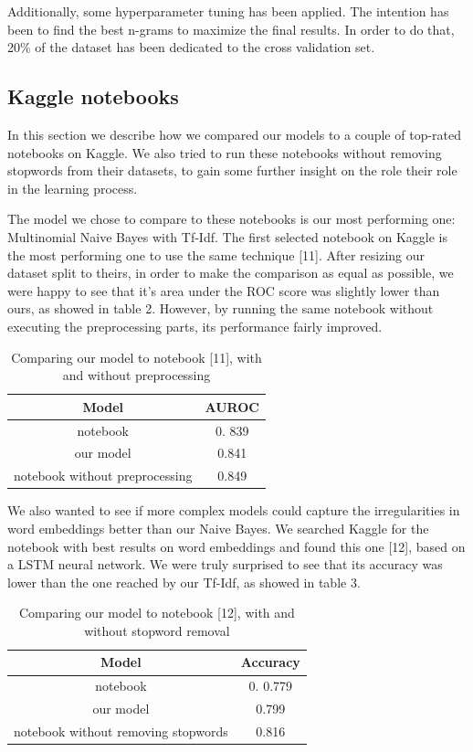 Additionally, some hyperparameter tuning has been applied. The intention has been to find the best n-grams
to maximize the final results.
In order to do that, 20\% of the dataset has been dedicated to the cross validation set.

\subsection*{Kaggle notebooks}

In this section we describe how we compared our models to a couple of top-rated notebooks on Kaggle.  We also tried to run these notebooks without removing stopwords from their datasets, to gain some further insight on the role their role in the learning process. 

The model we chose to compare to these notebooks is our most performing one: Multinomial Naive Bayes with Tf-Idf.  The first selected notebook on Kaggle is the most performing one to use the same technique [11].  After resizing our dataset split to theirs, in order to make the comparison as equal as possible,  we were happy to see that it's area under the ROC score was slightly lower than ours,  as showed in table 2.  However, by running the same notebook without executing the preprocessing parts, its performance fairly improved.

\begin{table}[h!t]
    \centering
    \caption{Comparing our model to notebook [11],  with and without preprocessing}
    \label{tab:versus_metrics}
    \begin{tabular}{c|c}
        \hline
        Model & AUROC \\
        \hline 
        notebook & 0. 839 \\ 
        our model & 0.841 \\ 
        notebook without preprocessing & 0.849 \\ 
        \hline
    \end{tabular}
\end{table}

We also wanted to see if more complex models could capture the irregularities in word embeddings better than our Naive Bayes.  We searched Kaggle for the notebook with best results on word embeddings and found this one [12],  based on a LSTM neural network.  We were truly surprised to see that its accuracy was lower than the one reached by our Tf-Idf,  as showed in table 3. 

\begin{table}[h!t]
    \centering
    \caption{Comparing our model to notebook [12],  with and without stopword removal}
    \label{tab:versus_metrics}
    \begin{tabular}{c|c}
        \hline
        Model & Accuracy\\
        \hline 
        notebook & 0. 0.779 \\ 
        our model & 0.799 \\ 
        notebook without removing stopwords & 0.816 \\ 
        \hline
    \end{tabular}
\end{table}

